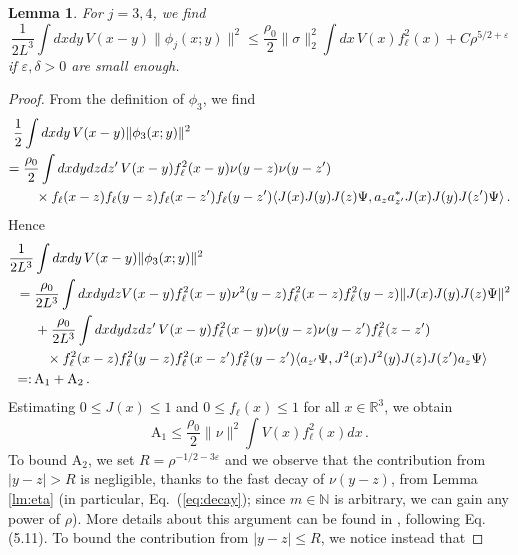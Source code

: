\documentclass[a4paper,11pt]{article}
\def\bR{\mathbb{R}}
\def\bN{\mathbb{N}}
\def\eps{\varepsilon}
\newtheorem{lemma}[theorem]{Lemma}
\numberwithin{equation}{section}
\begin{document}
\begin{lemma} \label{lm:phi3}
For $j=3,4$, we find 
\[ \frac{1}{2L^3} \int dx dy \, V(x-y) \| \phi_j (x;y) \|^2 \leq \frac{\rho_0}{2} \| \sigma \|_2^2 \int dx \, V(x) f_\ell^2 (x) + C \rho^{5/2+\eps} \]
if $\eps , \delta > 0$ are small enough. 
\end{lemma} 
\begin{proof} 
From the definition of $\phi_3$, we find  
\[ \begin{split}  \frac{1}{2} &\int dx dy \, V(x-y) \| \phi_3 (x;y) \|^2 \\ = \; & \frac{\rho_0}{2} \int dx dy dz dz' \, V(x-y) f_\ell^2 (x-y) \nu (y-z) \nu (y-z') \\ &\hspace{.3cm} \times f_\ell(x-z) f_\ell(y-z) f_\ell(x-z') f_\ell(y-z') \langle J(x) J(y) J(z) \Psi , a_z a_{z'}^* J(x) J(y) J(z') \Psi \rangle \,. \end{split}  \]
 Hence
 \[  \begin{split}  \frac{1}{2L^3} &\int dx dy \, V(x-y) \| \phi_3 (x;y) \|^2 \\ = \; &\frac{\rho_0}{2L^3} \int dx dy dz V(x-y) f_\ell^2 (x-y) \nu^2 (y-z) f_\ell^2 (x-z) f_\ell^2 (y-z) \| J(x) J(y) J(z) \Psi \|^2 \\ &+ \frac{\rho_0}{2L^3} \int dx dy dz dz' \, V(x-y) f_\ell^2 (x-y) \nu (y-z) \nu (y-z')  f_\ell^2 (z-z')  \\ &\hspace{.3cm} \times f_\ell^2(x-z) f_\ell^2(y-z) f_\ell^2 (x-z') f_\ell^2(y-z') \langle a_{z'} \Psi ,  J^2 (x) J^2 (y) J(z) J(z') a_z \Psi \rangle \\ =: \, & \text{A}_1 + \text{A}_2  \,.
 \end{split} \]
Estimating $0 \leq J (x) \leq 1$ and $0 \leq f_\ell(x) \leq 1$ for all $x \in \bR^3$, we obtain 
 \begin{equation}\label{eq:A1-fin} \text{A}_1 \leq \frac{\rho_0}{2} \| \nu \|^2 \int V(x) f_\ell^2 (x) dx \,. \end{equation} 
To bound $\text{A}_2$, we set $R = \rho^{-1/2-3\eps}$ and we observe that the contribution from $|y-z| > R$ is negligible, thanks to the fast decay of $\nu (y-z)$, from Lemma \ref{lm:eta} (in particular, Eq.~(\ref{eq:decay}); since $m \in \bN$ is arbitrary, we can gain any power of $\rho$). More details about this argument can be found in \cite{BBCOS}, following Eq. (5.11). To bound the contribution from $|y-z| \leq R$, we notice instead that

\end{proof}
\end{document}
